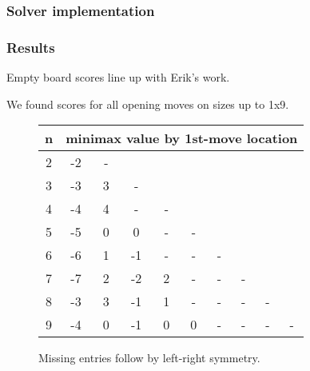 \documentclass{beamer}
\begin{document}
    \begin{frame}
        \frametitle{Solver implementation}
    \end{frame}

    \begin{frame}
        \frametitle{Results}
        Empty board scores line up with Erik's work.

        We found scores for all opening moves on sizes up to 1x9.

        \begin{figure}[th]
        \begin{tabular}{|c|ccccccccc|} \hline
        n & \multicolumn{9}{c|}{minimax value by 1st-move location} \\ \hline
        2 & -2 & - &&&&&&& \\
        3 & -3 & 3 & - &&&&&& \\
        4 & -4 & 4 & - & - &&&&& \\
        5 & -5 & 0 & 0 & - & - &&&& \\
        6 & -6 & 1 & -1 & - & - & - &&&\\
        7 & -7 &  2 & -2 & 2 & - & - & - &&\\
        8 & -3 &  3 & -1 & 1 & - & - & - & - &\\
        9 & -4 & 0  & -1  & 0 & 0 & - & - & - & -\\ \hline
        \end{tabular}
        \caption{Missing entries follow by left-right symmetry.}\label{fig:1st_move_value}
        \label{fig:mmx}
        \end{figure}
    \end{frame}
\end{document}
